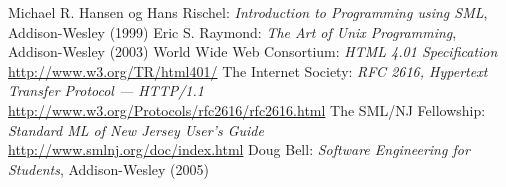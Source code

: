 \documentclass[a4paper,oneside]{memoir}
\begin{document}
\begin{thebibliography}{9}
 Michael R. Hansen og Hans Rischel: {\em
  Introduction to Programming using SML}, Addison-Wesley (1999)
 Eric S. Raymond: {\em
  The Art of Unix Programming}, Addison-Wesley (2003)
 World Wide Web Consortium: {\em HTML 4.01
  Specification}\\ \url{http://www.w3.org/TR/html401/}
 The Internet Society: {\em RFC 2616, Hypertext Transfer Protocol --- HTTP/1.1}\\
  \url{http://www.w3.org/Protocols/rfc2616/rfc2616.html}
 The SML/NJ Fellowship: {\em Standard ML of New
  Jersey User's Guide}\\ 
  \url{http://www.smlnj.org/doc/index.html}
 Doug Bell: {\em Software Engineering for Students},
  Addison-Wesley (2005)
\end{thebibliography}
\end{document}

